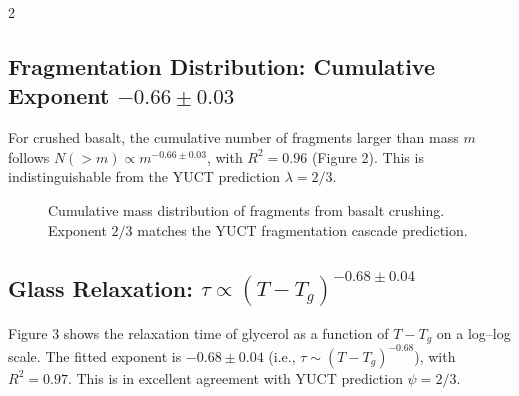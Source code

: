 \documentclass[11pt,a4paper]{article}
\begin{document}
\begin{multicols}{2}
		\subsection{Fragmentation Distribution: Cumulative Exponent \(-0.66 \pm 0.03\)}
		
		For crushed basalt, the cumulative number of fragments larger than mass \(m\) follows \(N(>m) \propto m^{-0.66 \pm 0.03}\), with \(R^2 = 0.96\) (Figure 2). This is indistinguishable from the YUCT prediction \(\lambda = 2/3\).
		
		\begin{figure}[htbp]
			\centering
			\caption{Cumulative mass distribution of fragments from basalt crushing. Exponent $2/3$ matches the YUCT fragmentation cascade prediction.}
			\label{fig:fragmentation}
		\end{figure}
		
		\subsection{Glass Relaxation: \(\tau \propto (T - T_g)^{-0.68 \pm 0.04}\)}
		
		Figure 3 shows the relaxation time of glycerol as a function of \(T - T_g\) on a log–log scale. The fitted exponent is \(-0.68 \pm 0.04\) (i.e., \(\tau \sim (T - T_g)^{-0.68}\)), with \(R^2 = 0.97\). This is in excellent agreement with YUCT prediction \(\psi = 2/3\).
		

\end{multicols}
\end{document}

